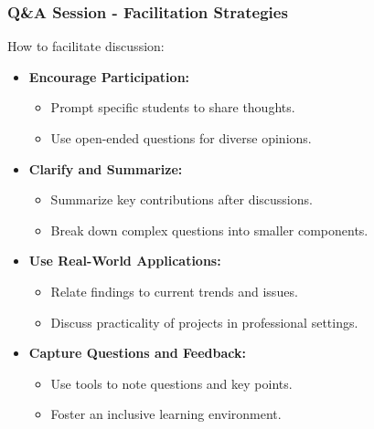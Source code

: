 \documentclass[aspectratio=169]{beamer}
\begin{document}
\begin{frame}[fragile]
  \frametitle{Q\&A Session - Facilitation Strategies}
  How to facilitate discussion:
  \begin{itemize}
      \item \textbf{Encourage Participation:}
        \begin{itemize}
          \item Prompt specific students to share thoughts.
          \item Use open-ended questions for diverse opinions.
        \end{itemize}
      \item \textbf{Clarify and Summarize:}
        \begin{itemize}
          \item Summarize key contributions after discussions.
          \item Break down complex questions into smaller components.
        \end{itemize}
      \item \textbf{Use Real-World Applications:}
        \begin{itemize}
          \item Relate findings to current trends and issues.
          \item Discuss practicality of projects in professional settings.
        \end{itemize}
      \item \textbf{Capture Questions and Feedback:}
        \begin{itemize}
          \item Use tools to note questions and key points.
          \item Foster an inclusive learning environment.
        \end{itemize}
  \end{itemize}
\end{frame}
\end{document}

